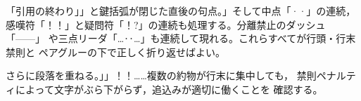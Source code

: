 \documentclass[pdflatex]{jlreq}
\begin{document}
\hsize=100pt \parindent=0pt
「引用の終わり」」と鍵括弧が閉じた直後の句点。」そして中点「··」の連続，
感嘆符「！！」と疑問符「！?」の連続も処理する。分離禁止のダッシュ「——」
や三点リーダ「…‥…」も連続して現れる。これらすべてが行頭・行末禁則と
ペアグルーの下で正しく折り返せばよい。

さらに段落を重ねる。」」！！……複数の約物が行末に集中しても，
禁則ペナルティによって文字がぶら下がらず，追込みが適切に働くことを
確認する。
\end{document}
